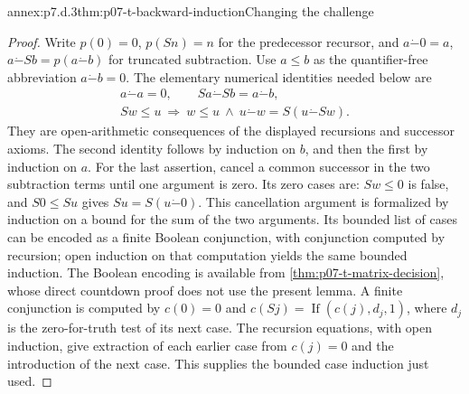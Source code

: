 \begin{annexitem}{annex:p7.d.3}{thm:p07-t-backward-induction}{Changing the challenge}
\begin{proof}
Write \(p(0)=0\), \(p(Sn)=n\) for the predecessor recursor, and
\(a\mathbin{\dot{-}}0=a\),
\(a\mathbin{\dot{-}}Sb=p(a\mathbin{\dot{-}}b)\) for truncated
subtraction. Use \(a\leq b\) as the quantifier-free abbreviation
\(a\mathbin{\dot{-}}b=0\). The elementary numerical identities
needed below are
\[
\begin{gathered}
 a\mathbin{\dot{-}}a=0,\qquad
 Sa\mathbin{\dot{-}}Sb=a\mathbin{\dot{-}}b,\\
 Sw\leq u\ \Longrightarrow\
 w\leq u\ \land\
 u\mathbin{\dot{-}}w=S(u\mathbin{\dot{-}}Sw).
 \tag{N}
\end{gathered}
\]
They are open-arithmetic consequences of the displayed recursions and
successor axioms. The second identity follows by induction on \(b\),
and then the first by induction on \(a\). For the last assertion,
cancel a common successor in the two subtraction terms until one
argument is zero. Its zero cases are: \(Sw\leq0\) is false, and
\(S0\leq Su\) gives \(Su=S(u\mathbin{\dot{-}}0)\).
This cancellation argument is formalized by induction on a bound for
the sum of the two arguments. Its bounded list of cases can be encoded
as a finite Boolean conjunction, with conjunction computed by recursion;
open induction on that computation yields the same bounded induction.
The Boolean encoding is available from
\cref{thm:p07-t-matrix-decision}, whose direct countdown proof does not
use the present lemma. A finite conjunction is computed by
\(c(0)=0\) and \(c(Sj)=\operatorname{If}(c(j),d_j,1)\), where
\(d_j\) is the zero-for-truth test of its next case. The recursion
equations, with open induction, give extraction of each earlier case
from \(c(j)=0\) and the introduction of the next case. This supplies
the bounded case induction just used.


\end{proof}
\end{annexitem}
